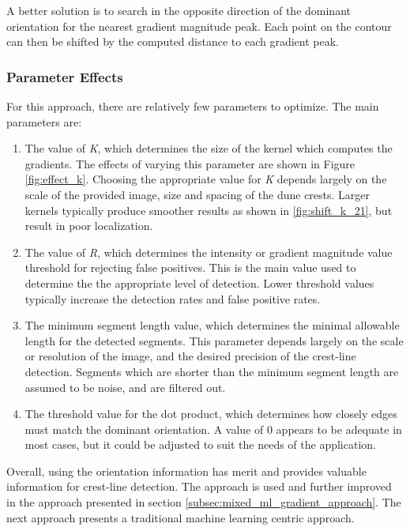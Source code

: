 A better solution is to search in the opposite direction of the dominant orientation for the nearest gradient magnitude peak. Each point on the contour can then be shifted by the computed distance to each gradient peak.

\subsubsection*{Parameter Effects}

For this approach, there are relatively few parameters to optimize. The main parameters are:

\begin{enumerate}
	\item The value of \emph{K}, which determines the size of the kernel which computes the gradients. The effects of varying this parameter are shown in Figure \ref{fig:effect_k}. Choosing the appropriate value for \emph{K} depends largely on the scale of the provided image, size and spacing of the dune crests. Larger kernels typically produce smoother results as shown in \ref{fig:shift_k_21}, but result in poor localization.
	\item  The value of \emph{R}, which determines the intensity or gradient magnitude value threshold for rejecting false positives. This is the main value used to determine the the appropriate level of detection. Lower threshold values typically increase the detection rates and false positive rates.
	\item The minimum segment length value, which determines the minimal allowable length for the detected segments. This parameter depends largely on the scale or resolution of the image, and the desired precision of the crest-line detection. Segments which are shorter than the minimum segment length are assumed to be noise, and are filtered out.
	\item The threshold value for the dot product, which determines how closely edges must match the dominant orientation. A value of 0 appears to be adequate in most cases, but it could be adjusted to suit the needs of the application.
\end{enumerate}

Overall, using the orientation information has merit and provides valuable information for crest-line detection. The approach is used and further improved in the approach presented in section \ref{subsec:mixed_ml_gradient_approach}. The next approach presents a traditional machine learning centric approach.



